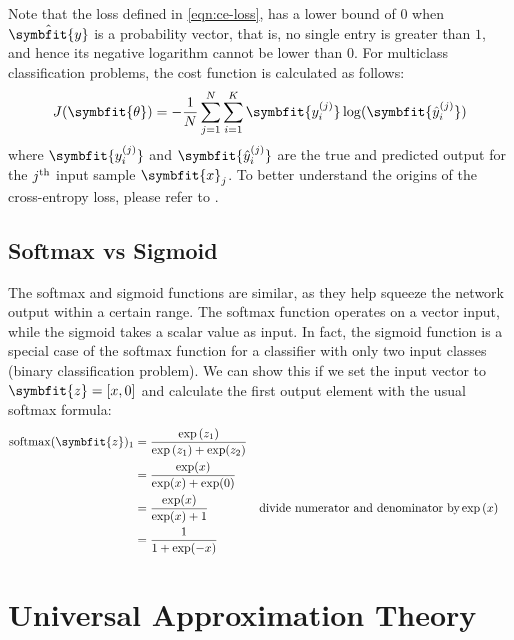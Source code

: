 Note that the loss defined in \cref{eqn:ce-loss}, has a lower bound of $0$ when $\hat{\symbfit{y}}$ is a probability vector, that is, no single entry is greater than $1$, and hence its negative logarithm cannot be lower than $0$. For multiclass classification problems, the cost function is calculated as follows:
\begin{equation}
    J(\symbfit{\theta}) = - \frac{1}{N} \sum_{j=1}^{N} \sum_{i=1}^{K} \symbfit{y_{i}^{(j)}}\log(\symbfit{\hat{y}_{i}^{(j)}})
\end{equation}
where $\symbfit{y_{i}^{(j)}}$ and $\symbfit{\hat{y}_{i}^{(j)}}$ are the true and predicted output for the $j\textsuperscript{th}$ input sample $\symbfit{x}_j$. To better understand the origins of the cross-entropy loss, please refer to \textcite{zhang2021dive}.

\subsection{Softmax vs Sigmoid}\label{ssec:softmax-vs-sigmoid}
The softmax and sigmoid functions are similar, as they help squeeze the network output within a certain range. The softmax function operates on a vector input, while the sigmoid takes a scalar value as input. In fact, the sigmoid function is a special case of the softmax function for a classifier with only two input classes (binary classification problem). We can show this if we set the input vector to $\symbfit{z} = [x, 0]$ and calculate the first output element with the usual softmax formula:
\begin{align*}
    \operatorname{softmax}(\symbfit{z})_{1}&=\frac{\exp{(z_{1})}}{\exp{(z_{1})}+\exp(z_{2})} \\
    &= \frac{\exp(x)}{\exp(x)+\exp(0)} \\
    &= \frac{\exp(x)}{\exp(x)+1} && \text{divide numerator and denominator by} \exp{(x)}\\
    &= \frac{1}{1 + \exp(-x)}
\end{align*}


\section{Universal Approximation Theory}\label{sec:uat}

